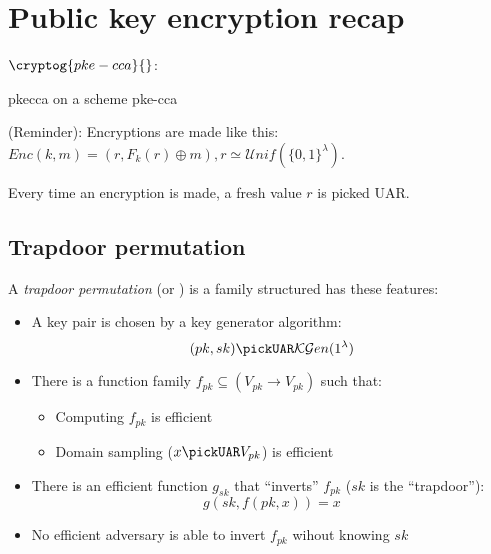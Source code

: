 \section{Public key encryption recap} 

$\cryptog{pke-cca}{}$:

\begin{cryptogame}
    {pkecca}
    {\cca{} on a \pke{} scheme}
    {pke-cca}
    

    \cseqdelay
    \cseqbeginloop


    \cseqendloop
    \cseqdelay



    \cseqdelay
    \cseqbeginloop


    \cseqendloop
    \cseqdelay

\end{cryptogame}


(Reminder): Encryptions are made like this: $Enc(k, m) = (r, F_k(r) \oplus m), r \simeq \mathcal{U}nif(\{0, 1\}^\lambda)$.

Every time an encryption is made, a fresh value $r$ is picked UAR.

\pagebreak
\subsection{Trapdoor permutation}

A \emph{trapdoor permutation} (or \tdp) is a \owp{} family structured has these features:

\begin{itemize}
    \item A key pair is chosen \uar{} by a key generator algorithm:
    \[
        (pk, sk) \pickUAR \mathcal{KG}en(1^\lambda)
    \]
    \item There is a function family $f_{pk} \subseteq (V_{pk} \to V_{pk})$ such that:
    \begin{itemize}
        \item Computing $f_{pk}$ is efficient
        \item Domain sampling ($x \pickUAR V_{pk}$) is efficient
    \end{itemize}
    \item There is an efficient function $g_{sk}$ that ``inverts'' $f_{pk}$ ($sk$ is the ``trapdoor''): 
    \begin{equation*}
        g(sk, f(pk, x)) = x
    \end{equation*}
    \item No efficient adversary is able to invert $f_{pk}$ wihout knowing $sk$
\end{itemize}

